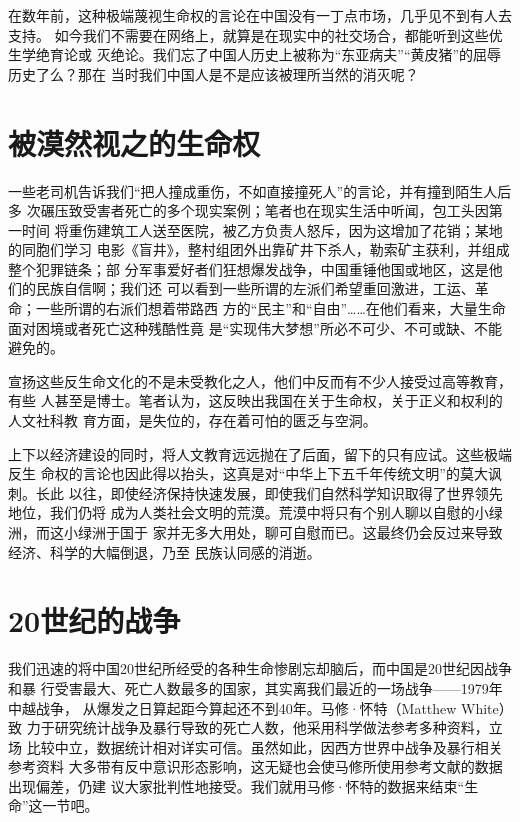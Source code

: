 在数年前，这种极端蔑视生命权的言论在中国没有一丁点市场，几乎见不到有人去支持。
如今我们不需要在网络上，就算是在现实中的社交场合，都能听到这些优生学绝育论或
灭绝论。我们忘了中国人历史上被称为“东亚病夫”“黄皮猪”的屈辱历史了么？那在
当时我们中国人是不是应该被理所当然的消灭呢？

\section{被漠然视之的生命权}

一些老司机告诉我们“把人撞成重伤，不如直接撞死人”的言论，并有撞到陌生人后多
次碾压致受害者死亡的多个现实案例；笔者也在现实生活中听闻，包工头因第一时间
将重伤建筑工人送至医院，被乙方负责人怒斥，因为这增加了花销；某地的同胞们学习
电影《盲井》，整村组团外出靠矿井下杀人，勒索矿主获利，并组成整个犯罪链条；部
分军事爱好者们狂想爆发战争，中国重锤他国或地区，这是他们的民族自信啊；我们还
可以看到一些所谓的左派们希望重回激进，工运、革命；一些所谓的右派们想着带路西
方的“民主”和“自由”……在他们看来，大量生命面对困境或者死亡这种残酷性竟
是“实现伟大梦想”所必不可少、不可或缺、不能避免的。

宣扬这些反生命文化的不是未受教化之人，他们中反而有不少人接受过高等教育，有些
人甚至是博士。笔者认为，这反映出我国在关于生命权，关于正义和权利的人文社科教
育方面，是失位的，存在着可怕的匮乏与空洞。

上下以经济建设的同时，将人文教育远远抛在了后面，留下的只有应试。这些极端反生
命权的言论也因此得以抬头，这真是对“中华上下五千年传统文明”的莫大讽刺。长此
以往，即使经济保持快速发展，即使我们自然科学知识取得了世界领先地位，我们仍将
成为人类社会文明的荒漠。荒漠中将只有个别人聊以自慰的小绿洲，而这小绿洲于国于
家并无多大用处，聊可自慰而已。这最终仍会反过来导致经济、科学的大幅倒退，乃至
民族认同感的消逝。

\section{20世纪的战争}

我们迅速的将中国20世纪所经受的各种生命惨剧忘却脑后，而中国是20世纪因战争和暴
行受害最大、死亡人数最多的国家，其实离我们最近的一场战争——1979年中越战争，
从爆发之日算起距今算起还不到40年。马修·怀特（Matthew White）\cite{mattwhite}致
力于研究统计战争及暴行导致的死亡人数，他采用科学做法参考多种资料，立场
比较中立，数据统计相对详实可信。虽然如此，因西方世界中战争及暴行相关参考资料
大多带有反中意识形态影响，这无疑也会使马修所使用参考文献的数据出现偏差，仍建
议大家批判性地接受。我们就用马修·怀特的数据来结束“生命”这一节吧。


